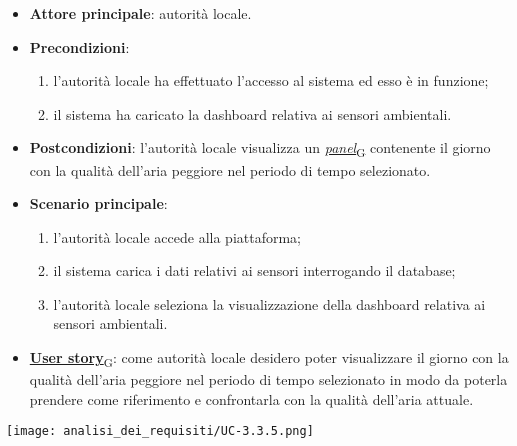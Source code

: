 \begin{itemize}
	\item \textbf{Attore principale}: autorità locale.
	\item \textbf{Precondizioni}:
	      \begin{enumerate}
		      \item l'autorità locale ha effettuato l'accesso al sistema ed esso è in funzione;
		      \item il sistema ha caricato la dashboard relativa ai sensori ambientali.
	      \end{enumerate}
	\item \textbf{Postcondizioni}: l'autorità locale visualizza un \href{https://7last.github.io/docs/pb/documentazione-interna/glossario\#panel}{\textit{panel}\textsubscript{G}} contenente il giorno con la qualità dell'aria peggiore nel periodo di tempo selezionato.
	\item \textbf{Scenario principale}:
	      \begin{enumerate}
		      \item l'autorità locale accede alla piattaforma;
		      \item il sistema carica i dati relativi ai sensori interrogando il database;
		      \item l'autorità locale seleziona la visualizzazione della dashboard relativa ai sensori ambientali.
	      \end{enumerate}
	\item \href{https://7last.github.io/docs/pb/documentazione-interna/glossario\#user-story}{\textbf{User story}\textsubscript{G}}:
	      come autorità locale desidero poter visualizzare il giorno con la qualità dell'aria peggiore nel periodo di tempo selezionato
	      in modo da poterla prendere come riferimento e confrontarla con la qualità dell'aria attuale.
\end{itemize}
\begin{center}
	\texttt{[image: analisi\_dei\_requisiti/UC-3.3.5.png]}
\end{center}


